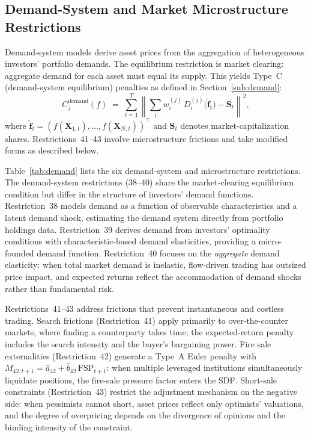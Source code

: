 \subsection{Demand-System and Market Microstructure Restrictions}\label{sub:demand_restrictions}

Demand-system models derive asset prices from the aggregation of heterogeneous investors' portfolio demands.
The equilibrium restriction is market clearing: aggregate demand for each asset must equal its supply.
This yields Type~C (demand-system equilibrium) penalties as defined in Section~\ref{sub:demand}:
\begin{equation}\label{eq:demand_family}
C_j^{\mathrm{demand}}(f) \;=\;
\sum_{t=1}^{T}
\left\|
\sum_{i} w_i^{(j)}\, D_i^{(j)}\bigl(\hat{\mathbf{f}}_t\bigr) - \mathbf{S}_t
\right\|^2,
\end{equation}
where $\hat{\mathbf{f}}_t = (f(\mathbf{X}_{1,t}), \ldots, f(\mathbf{X}_{N,t}))^\top$ and $\mathbf{S}_t$ denotes market-capitalization shares.
Restrictions~41--43 involve microstructure frictions and take modified forms as described below.

Table~\ref{tab:demand} lists the six demand-system and microstructure restrictions. The demand-system restrictions (38--40) share the market-clearing equilibrium condition but differ in the structure of investors' demand functions.
Restriction~38 models demand as a function of observable characteristics and a latent demand shock, estimating the demand system directly from portfolio holdings data.
Restriction~39 derives demand from investors' optimality conditions with characteristic-based demand elasticities, providing a micro-founded demand function.
Restriction~40 focuses on the \emph{aggregate} demand elasticity: when total market demand is inelastic, flow-driven trading has outsized price impact, and expected returns reflect the accommodation of demand shocks rather than fundamental risk.

Restrictions~41--43 address frictions that prevent instantaneous and costless trading.
Search frictions (Restriction~41) apply primarily to over-the-counter markets, where finding a counterparty takes time; the expected-return penalty includes the search intensity and the buyer's bargaining power.
Fire sale externalities (Restriction~42) generate a Type~A Euler penalty with $M_{42,t+1} = \hat{a}_{42} + \hat{b}_{42}\,\mathrm{FSP}_{t+1}$: when multiple leveraged institutions simultaneously liquidate positions, the fire-sale pressure factor enters the SDF.
Short-sale constraints (Restriction~43) restrict the adjustment mechanism on the negative side: when pessimists cannot short, asset prices reflect only optimists' valuations, and the degree of overpricing depends on the divergence of opinions and the binding intensity of the constraint.


